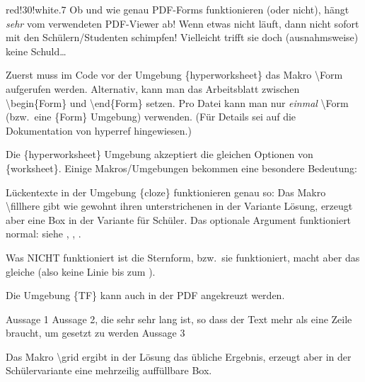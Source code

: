 \documentclass[hyperworksheet]{drcschool}
\newcommand*{\cs}[1]{\textup{\ttfamily\textbackslash#1}}                   %
\newcommand*{\pkg}[1]{\textup{\ttfamily#1}}                                %
\newcommand*{\env}[1]{\textup{\ttfamily\{#1\}}}                            %
\begin{document}
\Form  %
\begin{hyperworksheet}

\begin{center}
\begin{colorminipage}{red!30!white}{.7\linewidth}
Ob und wie genau PDF-Forms funktionieren (oder nicht), hängt \emph{sehr} vom
verwendeten PDF-Viewer ab! Wenn etwas nicht läuft, dann nicht sofort mit den
Schülern/Studenten schimpfen! Vielleicht trifft sie doch (ausnahmsweise) keine
Schuld\ldots
\end{colorminipage}
\end{center}

\noindent
Zuerst muss im Code vor der Umgebung \env{hyperworksheet} das Makro \cs{Form}
aufgerufen werden. Alternativ, kann man das Arbeitsblatt zwischen
\cs{begin\{Form\}} und \cs{end\{Form\}} setzen. Pro Datei kann man nur \emph{einmal}
\cs{Form} (bzw.~eine \env{Form} Umgebung) verwenden. (Für Details sei auf die Dokumentation
von \pkg{hyperref} hingewiesen.)

Die \env{hyperworksheet} Umgebung akzeptiert die gleichen Optionen von \env{worksheet}.
Einige Makros/Umgebungen bekommen eine besondere Bedeutung:

\exercise[Lückentexte]
\begin{cloze}
Lückentexte in der Umgebung \env{cloze} funktionieren genau so: Das Makro \cs{fillhere}
gibt wie gewohnt ihren unterstrichenen  in der Variante  Lösung,
erzeugt aber eine  Box in der Variante für Schüler.
Das optionale Argument funktioniert normal: siehe , ,
.

Was NICHT funktioniert ist die Sternform, bzw.~sie funktioniert, macht aber das gleiche
(also keine Linie bis zum ).
\end{cloze}

Die Umgebung \env{TF} kann auch in der PDF angekreuzt werden.
\begin{TF}[.8\linewidth]
Aussage 1 \true
\midrule
Aussage 2, die sehr sehr lang ist, so dass der Text mehr als eine Zeile braucht, um gesetzt zu werden \false
\midrule
Aussage 3 \false
\end{TF}

\exercise[Grids]
Das Makro \cs{grid} ergibt in der Lösung das übliche Ergebnis, erzeugt aber in der Schülervariante
eine mehrzeilig auf{}füllbare Box.


\end{hyperworksheet}
\end{document}
